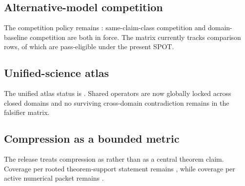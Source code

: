 \subsection{Alternative-model competition}
The competition policy remains : same-claim-class competition and domain-baseline competition are both in force. The matrix currently tracks  comparison rows, of which  are pass-eligible under the present SPOT.

\subsection{Unified-science atlas}
The unified atlas status is . Shared operators are now globally locked across closed domains and no surviving cross-domain contradiction remains in the falsifier matrix.

\subsection{Compression as a bounded metric}
The release treats compression as  rather than as a central theorem claim. Coverage per rooted theorem-support statement remains , while coverage per active numerical packet remains .
